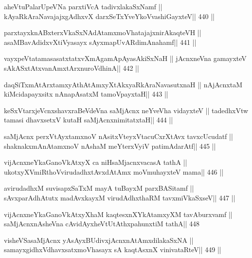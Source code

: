 \begin{shl}
aheVtuPalarUpeVNa parxtiVcA tadivxlakaSxNamf ||
kAyaRkAraNavajajxgAdhxvX darxSeTxYveYkoV\s vashiGayxteV\hfill || 440 ||
\end{shl}

\begin{shl}
parxtayxknABxterxVkaSxNAdAtamxmoVhatajajxnirAkaqteVH ||
asaMBavAdidxvXtiVyasayx sAyxmapUvARdimAnahamf\hfill || 441 ||
\end{shl}

\begin{shl}
vayxpeVtatamasasatxtatxvXmAgamApAyasAkiSxNaH ||
jAcnxneVna gamayxteV sAkASxtAtxvanAmxtArxnuroVdhinA\hfill || 442 ||
\end{shl}

\begin{shl}
daqSiTxmAtArxtamxyAthAtAmxyXtAkxyaRkAraNavasutxnaH ||
nAjAcnxtaM kiMcidapayxsitx nAnapAsatxM tamoV\s payxtaH\hfill || 443 ||
\end{shl}

\begin{shl}
keSxVtarxjeVcnxshavxraBeVdeVna saMjAcnx neYveVha vidayxteV ||
tadedhxVtw tamasi dhavxsetxV kutaH saMjAcnx\s nimitatxtaH\hfill || 444 ||
\end{shl}

\begin{shl}
saMjAcnx perxVtAyx\s\s tamxnoV nAsitxVteyxVtacuCxrXtAvx tavxcUcudatf ||
shaknakxmAnA\s\s tamxnoV nAshaM meYterxVyiV patimAdarAtf\hfill || 445 ||
\end{shl}

\begin{shl}
vijAcnxneYkaGanoVkAtxyX ca niHsaMjacnxvacasA tathA ||
ukotxyXVmiRthoVvirudadhxtAvxdAtAmx moVmuhayxteV mama\hfill || 446 ||
\end{shl}

\begin{shl}
avirudadhxM suvisapxSaTxM mayA tuBayxM parxBASitamf ||
sAvxparAdhAtutx madAvxkayxM virudAdhxthaRM tavxmiVkaSxseV\hfill || 447 ||
\end{shl}

\begin{shl}
vijAcnxneYkaGanoVkAtxyX\s haM kaqtesxnXYkAtamxyXM tavAburxvamf ||
saMjAcnxnAsheVna cAvidAyxheVtUtAthxpahunxtiM tathA\hfill || 448
\end{shl}

\begin{shl}
visheVSasaMjAcnx yA\s sAyxBUdivxjAcnxnAtAmxdilakaSxNA ||
samayxgidhxVdhavxsatxmoVhasayx sA kaqtAsxnX vinivataRteV\hfill || 449 ||
\end{shl}

